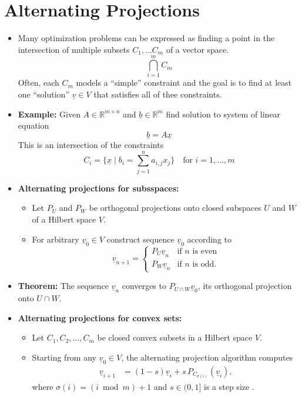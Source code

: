 \documentclass[11pt,twoside]{report}
\newcommand{\bbR}{{\mathbb{R}}}
\newcommand{\vecnot}{\underline}
\begin{document}
\begin{itemize}
\end{itemize}


\section{Alternating Projections} 


\begin{itemize}
\item Many optimization problems can be expressed as finding a point in the intersection of multiple subsets $C_1, \dots C_m$ of a vector space. 
\[
\bigcap_{i=1}^m C_m 
\]
Often, each $C_m$ models a ``simple'' constraint and the goal is to find at least one  ``solution'' $\vecnot{v} \in V$ that satisfies all of thee constraints. 


\item \textbf{Example:} Given $A \in\bbR^{m \times n}$ and $\vecnot{b} \in \bbR^m$ find solution to system of linear equation 
\[
\vecnot{b} = A \vecnot{x} 
\]
This is an intersection of the constraints 
\[
C_i = \Big\{ \vecnot{x} \mid b_i = \sum_{j=1}^n a_{i,j} x_j  \Big\}  \quad \text{for $i = 1, \dots, m$}
\]


\item \textbf{Alternating projections for subsspaces:}

\begin{itemize}
\item Let $P_U$ and $P_W$ be orthogonal projections onto closed subspaces $U$ and  $W$ of a Hilbert space $V$. 
\item For arbitrary $\vecnot{v}_0 \in V$ construct sequence $\vecnot{v}_0$ according to 
\[
\vecnot v_{n+1}=\begin{cases}
P_{U}\vecnot v_{n} & \text{if }n\text{ is even}\\
P_{W}\vecnot v_{n} & \text{if }n\text{ is odd}.
\end{cases}
\]



\end{itemize}


\item \textbf{Theorem:} The sequence $\vecnot v_{n}$ converges to $P_{U\cap W}\vecnot v_{0}$, its orthogonal projection onto $U\cap W$.


\item \textbf{Alternating projections for convex sets:}
\begin{itemize}
\item Let $C_{1},C_{2},\ldots,C_{m}$ be closed convex subsets in a Hilbert space $V$.
\item  Starting from any $\vecnot v_{0}\in V$, the alternating projection algorithm computes 
\begin{align*}
\vecnot v_{i+1} & = (1-s) \vecnot{v}_i + s\, P_{C_{\sigma(i)}}(\vecnot v_{i}),
\end{align*}
where $\sigma(i)=(i\bmod m)+1$ and $s\in(0,1]$ is a step size .



\end{itemize}
\end{itemize}
\end{document}
